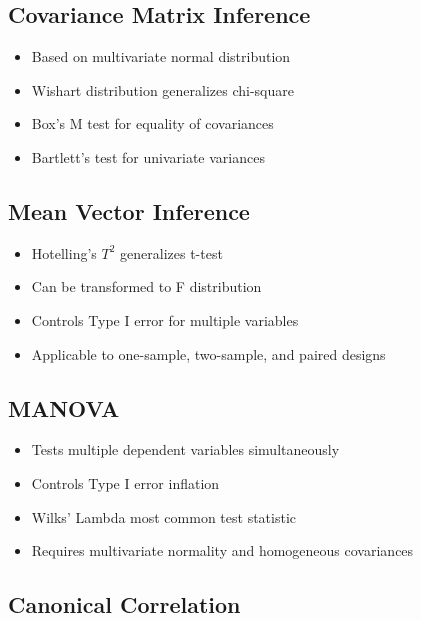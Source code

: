 \documentclass[
]{article}
\begin{document}
\subsection{Covariance Matrix Inference}

\begin{itemize}
\item
  Based on multivariate normal distribution
\item
  Wishart distribution generalizes chi-square
\item
  Box's M test for equality of covariances
\item
  Bartlett's test for univariate variances
\end{itemize}

\textbf{ }

\subsection{Mean Vector Inference}

\begin{itemize}
\item
  Hotelling's \(T^{2}\) generalizes t-test
\item
  Can be transformed to F distribution
\item
  Controls Type I error for multiple variables
\item
  Applicable to one-sample, two-sample, and paired designs
\end{itemize}

\textbf{ }

\subsection{MANOVA}

\begin{itemize}
\item
  Tests multiple dependent variables simultaneously
\item
  Controls Type I error inflation
\item
  Wilks' Lambda most common test statistic
\item
  Requires multivariate normality and homogeneous covariances
\end{itemize}

\textbf{ }

\subsection{Canonical Correlation}
\end{document}
